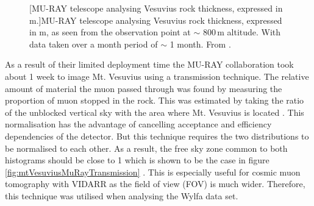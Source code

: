 \begin{figure}[!h]
\begin{minipage}{.45\textwidth}
  [MU-RAY telescope analysing Vesuvius rock thickness, expressed in m.]{MU-RAY telescope analysing Vesuvius rock thickness, expressed in m, as seen from the observation point at $\sim$ 800\,m altitude. With data taken over a month period of $\sim$ 1 month. From \cite{Ambrosino_2014}.}
  \label{fig:mtVesuviusMuRayImaging}
\end{minipage}
\end{figure}

As a result of their limited deployment time the MU-RAY collaboration took about 1 week to image Mt. Vesuvius using a transmission technique. The relative amount of material the muon passed through was found by measuring the proportion of muon stopped in the rock. This was estimated by taking the ratio of the unblocked vertical sky with the area where Mt. Vesuvius is located . This normalisation has the advantage of cancelling acceptance and efficiency dependencies of the detector. But this technique requires the two distributions to be normalised to each other. As a result, the free sky zone common to both histograms should be close to 1 which is shown to be the case in figure \ref{fig:mtVesuviusMuRayTransmission} \cite{Ambrosino_2014}. This is especially useful for cosmic muon tomography with VIDARR as the field of view (FOV) is much wider. Therefore, this technique was utilised when analysing the Wylfa data set.


